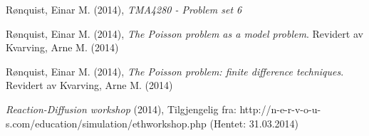 \begin{thebibliography}{9}

	Rønquist, Einar M. (2014),
	\emph{TMA4280 - Problem set 6}

	Rønquist, Einar M. (2014),
	\emph{The Poisson problem as a model problem}.
	Revidert av Kvarving, Arne M. (2014)

	Rønquist, Einar M. (2014),
	\emph{The Poisson problem: finite difference techniques}.
	Revidert av Kvarving, Arne M. (2014)

	\emph{Reaction-Diffusion workshop} (2014),
	Tilgjengelig fra: http://n-e-r-v-o-u-s.com/education/simulation/ethworkshop.php
	(Hentet: 31.03.2014)
\end{thebibliography}
